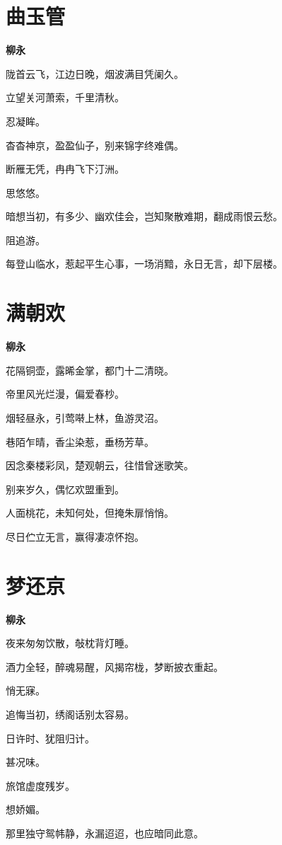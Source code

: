 \documentclass[12pt,a4paper]{ctexbook}
\begin{document}
\section{曲玉管}
\textbf{柳永}\par\vspace{0.5em}
陇首云飞，江边日晚，烟波满目凭阑久。\par
立望关河萧索，千里清秋。\par
忍凝眸。\par
杳杳神京，盈盈仙子，别来锦字终难偶。\par
断雁无凭，冉冉飞下汀洲。\par
思悠悠。\par
暗想当初，有多少、幽欢佳会，岂知聚散难期，翻成雨恨云愁。\par
阻追游。\par
每登山临水，惹起平生心事，一场消黯，永日无言，却下层楼。\par

\section{满朝欢}
\textbf{柳永}\par\vspace{0.5em}
花隔铜壶，露晞金掌，都门十二清晓。\par
帝里风光烂漫，偏爱春杪。\par
烟轻昼永，引莺啭上林，鱼游灵沼。\par
巷陌乍晴，香尘染惹，垂杨芳草。\par
因念秦楼彩凤，楚观朝云，往惜曾迷歌笑。\par
别来岁久，偶忆欢盟重到。\par
人面桃花，未知何处，但掩朱扉悄悄。\par
尽日伫立无言，赢得凄凉怀抱。\par

\section{梦还京}
\textbf{柳永}\par\vspace{0.5em}
夜来匆匆饮散，敧枕背灯睡。\par
酒力全轻，醉魂易醒，风揭帘栊，梦断披衣重起。\par
悄无寐。\par
追悔当初，绣阁话别太容易。\par
日许时、犹阻归计。\par
甚况味。\par
旅馆虚度残岁。\par
想娇媚。\par
那里独守鸳帏静，永漏迢迢，也应暗同此意。\par
\end{document}
